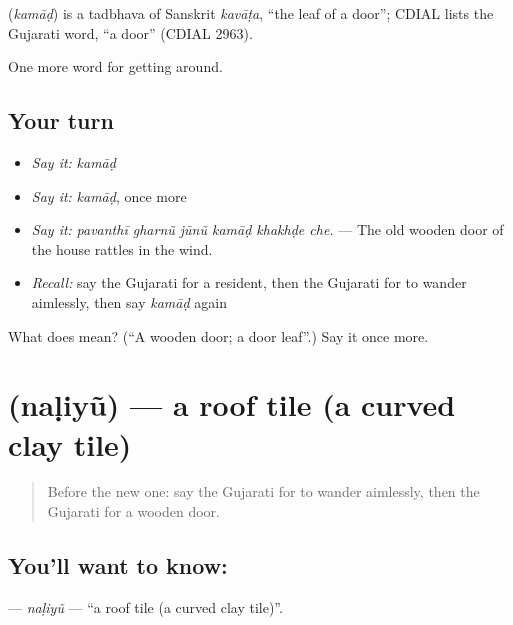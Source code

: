 \begin{cousinweb}
\textbf{} (\emph{kamāḍ}) is a tadbhava of Sanskrit \emph{kavāṭa}, \textquotedblleft{}the leaf of a door\textquotedblright{}; CDIAL lists the Gujarati word, \textquotedblleft{}a door\textquotedblright{} (CDIAL 2963).
\end{cousinweb}

\begin{grammarlens}[title={What you've built}]
One more word for getting around.
\end{grammarlens}

\subsection*{Your turn}
\begin{itemize}
\raggedright
  \item \emph{Say it:} \emph{kamāḍ}
  \item \emph{Say it:} \emph{kamāḍ}, once more
  \item \emph{Say it:} \emph{pavanthī gharnũ jūnũ kamāḍ khakhḍe che.} — The old wooden door of the house rattles in the wind.
  \item \emph{Recall:} say the Gujarati for a resident, then the Gujarati for to wander aimlessly, then say \emph{kamāḍ} again
\end{itemize}

\begin{tcolorbox}[breakable,colback=teal!4,colframe=teal!35!black,title={Before you move on}]
What does  mean? (\textquotedblleft{}A wooden door; a door leaf\textquotedblright{}.) Say it once more.
\end{tcolorbox}
\section[\texorpdfstring{\gu{નળિયું} (naḷiyũ)}{નળિયું (naḷiyũ)}]{ (naḷiyũ) — a roof tile (a curved clay tile)}

\label{lesson:GU-C420-naliyu}



\begin{quote}
Before the new one: say the Gujarati for to wander aimlessly, then the Gujarati for a wooden door.
\end{quote}

\subsection*{You'll want to know: }
\textbf{} — \emph{naḷiyũ} — \textquotedblleft{}a roof tile (a curved clay tile)\textquotedblright{}.

